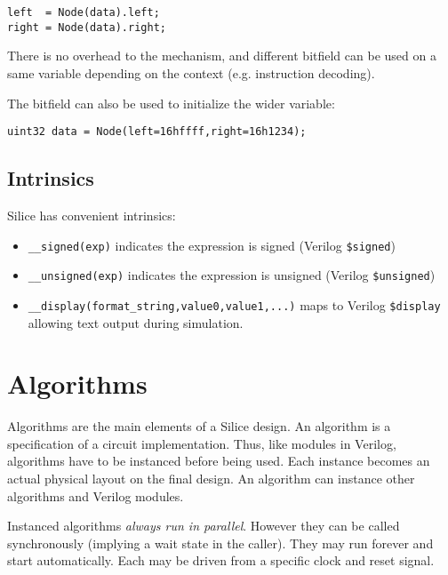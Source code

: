 \documentclass[a4]{article}
\newcommand\verilog{Verilog}
\newcommand\silice{Silice}
\begin{document}
\begin{verbatim}
left  = Node(data).left;
right = Node(data).right;
\end{verbatim}

There is no overhead to the mechanism, and different bitfield can be used on a same
variable depending on the context (e.g. instruction decoding).

The bitfield can also be used to initialize the wider variable:
\begin{verbatim}
uint32 data = Node(left=16hffff,right=16h1234);
\end{verbatim}


\subsection{Intrinsics}

\silice{} has convenient intrinsics:

\begin{itemize}
	\item \texttt{\_\_signed(exp)} indicates the expression is signed (Verilog \texttt{\$signed})
	\item \texttt{\_\_unsigned(exp)} indicates the expression is unsigned (Verilog \texttt{\$unsigned})
	\item \texttt{\_\_display(format\_string,value0,value1,...)} maps to Verilog \texttt{\$display} allowing text output during simulation.
\end{itemize}
	

\section{Algorithms}

Algorithms are the main elements of a \silice{} design. An algorithm is a specification of a circuit implementation. Thus, like modules in \verilog{}, algorithms have to be instanced before being used. Each instance becomes an actual physical layout on the final design.
An algorithm can instance other algorithms and \verilog{} modules. 

Instanced algorithms \textit{always run in parallel}. However they can be called synchronously (implying a wait state in the caller). They may run forever and start automatically. Each may be driven from a specific clock and reset signal.
\end{document}
